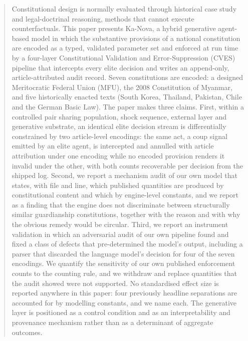 \documentclass{ieeeaccess}
\newif\ifpendingvisible
\newcommand{\todo}[1]{%
  \ifpendingvisible\textcolor{red}{\textbf{[\MakeUppercase{#1}]}}\fi}
\begin{document}
\begin{abstract}
Constitutional design is normally evaluated through historical case
study and legal-doctrinal reasoning, methods that cannot execute
counterfactuals. This paper presents Ka-Nova, a hybrid generative
agent-based model in which the substantive provisions of a national
constitution are encoded as a typed, validated parameter set and
enforced at run time by a four-layer Constitutional Validation and
Error-Suppression (CVES) pipeline that intercepts every elite decision
and writes an append-only, article-attributed audit record. Seven
constitutions are encoded: a designed Meritocratic Federal Union (MFU),
the 2008 Constitution of Myanmar, and five historically enacted texts
(South Korea, Thailand, Pakistan, Chile and the German Basic Law). The
paper makes three claims. First, within a controlled pair sharing
population, shock sequence, external layer and generative substrate, an
identical elite decision stream is differentially constrained by two
article-level encodings: the same act, a coup signal emitted by an
elite agent, is intercepted and annulled with article attribution under
one encoding while no encoded provision renders it invalid under the
other, with both counts recoverable per decision from the shipped log.
Second, we report a mechanism audit of our own model that states, with
file and line, which published quantities are produced by constitutional
content and which by engine-level constants, and we report as a finding
that the engine does not discriminate between structurally similar
guardianship constitutions, together with the reason and with why the
obvious remedy would be circular. Third, we report an instrument
validation in which an adversarial audit of our own pipeline found and
fixed a class of defects that pre-determined the model's output,
including a parser that discarded the language model's decision for four
of the seven encodings. We quantify the sensitivity of our own published
enforcement counts to the counting rule, and we withdraw and replace
quantities that the audit showed were not supported. No standardised
effect size is reported anywhere in this paper: four previously
headline separations are accounted for by modelling constants, and we
name each. The generative layer is positioned as a control condition and
as an interpretability and provenance mechanism rather than as a
determinant of aggregate outcomes.
\todo{PENDING CAMPAIGN: one sentence giving the headline enforcement
counts from the re-run, and one giving the collapse-timing result, both
to be inserted only once the campaign reports.}
\end{abstract}
\end{document}
